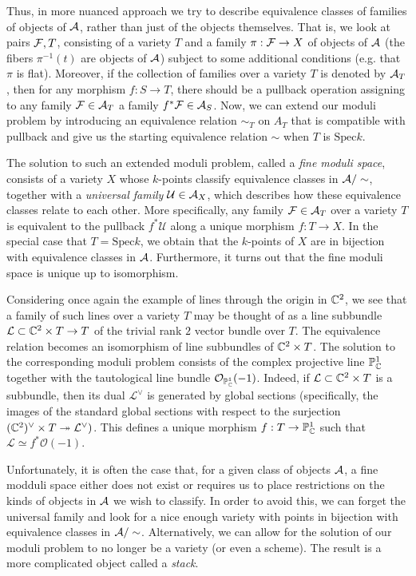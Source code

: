         Thus, in more nuanced approach we try to describe equivalence classes of families of objects of $\mathcal{A}$, rather than just of the objects themselves. That is, we look at pairs $\mathcal{F},T$, consisting of a variety $T$ and a family $\pi:\mathcal{F}\to X$ of objects of $\mathcal{A}$ (the fibers $\pi^{-1}(t)$ are objects of $\mathcal{A}$) subject to some additional conditions (e.g. that $\pi$ is flat). Moreover, if the collection of families over a variety $T$ is denoted by $\mathcal{A}_T$, then for any morphism $f:S\to T$, there should be a pullback operation assigning to any family $\mathcal{F}\in \mathcal{A}_T$ a family $f^*\mathcal{F}\in\mathcal{A}_S$. Now, we can extend our moduli problem by introducing an equivalence relation $\sim_T$ on $A_T$ that is compatible with pullback and give us the starting equivalence relation $\sim$ when $T$ is $\text{Spec}k$.
        
        The solution to such an extended moduli problem, called a \emph{fine moduli space}, consists of a variety $X$ whose $k$-points classify equivalence classes in $\mathcal{A}/\sim$, together with a \emph{universal family} $\mathcal{U}\in\mathcal{A}_X$, which describes how these equivalence classes relate to each other. More specifically, any family $\mathcal{F}\in\mathcal{A}_T$ over a variety $T$ is equivalent to the pullback $f^*\mathcal{U}$ along a unique morphism $f:T\to X$. In the special case that $T=\text{Spec}k$, we obtain that the $k$-points of $X$ are in bijection with equivalence classes in $\mathcal{A}$. Furthermore, it turns out that the fine moduli space is
        unique up to isomorphism. 
        
        Considering once again the example of lines through the origin in $\mathbb{C}^2$, we see that a family of such lines over a variety $T$ may be thought of as a line subbundle $\mathcal{L}\subset\mathbb{C}^2\times T\to T$ of the trivial rank $2$ vector bundle over $T$. The equivalence relation becomes an isomorphism of line subbundles of $\mathbb{C}^2\times T$. The solution to the corresponding moduli problem consists of the complex projective line $\mathbb{P}^1_{\mathbb{C}}$ together with the tautological line bundle $\mathcal{O}_{\mathbb{P}^1_{\mathbb{C}}}(-1)$. Indeed, if $\mathcal{L}\subset\mathbb{C}^2\times T$ is a subbundle, then its dual $\mathcal{L}^\vee$ is generated by global sections (specifically, the images of the standard global sections with respect to the surjection   $(\mathbb{C}^2)^\vee\times T\twoheadrightarrow\mathcal{L}^\vee)$. This defines a unique morphism $f:T\to\mathbb{P}^1_{\mathbb{C}}$ such that $\mathcal{L}\simeq f^*\mathcal{O}(-1)$.

        Unfortunately, it is often the case that, for a given class of objects $\mathcal{A}$, a fine modduli space either does not exist or requires us to place restrictions on the kinds of objects in $\mathcal{A}$ we wish to classify. In order to avoid this, we can forget the universal family and look for a nice enough variety with points in bijection with equivalence classes in $\mathcal{A}/\sim$. Alternatively, we can allow for the solution of our moduli problem to no longer be a variety (or even a scheme). The result is a more complicated object called a \emph{stack}.



